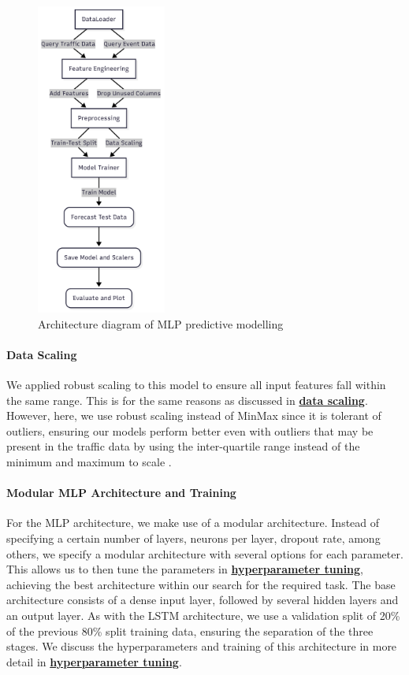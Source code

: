 \begin{figure}[!ht]
  \centering
  \includegraphics[width=0.38\textwidth]{images/design-implementation/mlp.png}
  \caption{Architecture diagram of MLP predictive modelling}
  \label{fig:mlp-arch}
\end{figure}

\paragraph{Data Scaling}
We applied robust scaling to this model to ensure all input features fall within the same range. This is for the same reasons as discussed in \textbf{\hyperref[link:data-scaling]{data scaling}}. However, here, we use robust scaling instead of MinMax since it is tolerant of outliers, ensuring our models perform better even with outliers that may be present in the traffic data by using the inter-quartile range instead of the minimum and maximum to scale \cite{noauthor_robustscaler_nodate}.

\paragraph{Modular MLP Architecture and Training}
\label{link:modular-mlp-arch}
For the MLP architecture, we make use of a modular architecture. Instead of specifying a certain number of layers, neurons per layer, dropout rate, among others, we specify a modular architecture with several options for each parameter. This allows us to then tune the parameters in \textbf{\hyperref[link:hyperparam-tuning]{hyperparameter tuning}}, achieving the best architecture within our search for the required task. The base architecture consists of a dense input layer, followed by several hidden layers and an output layer. As with the LSTM architecture, we use a validation split of 20\% of the previous 80\% split training data, ensuring the separation of the three stages. We discuss the hyperparameters and training of this architecture in more detail in \textbf{\hyperref[link:hyperparam-tuning]{hyperparameter tuning}}.

